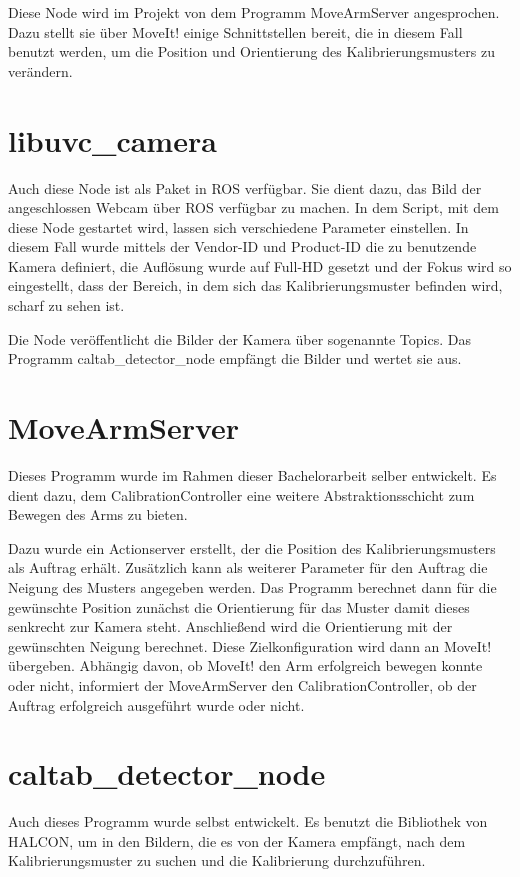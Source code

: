 Diese Node wird im Projekt von dem Programm MoveArmServer angesprochen. Dazu stellt sie über MoveIt! einige Schnittstellen bereit, die in diesem Fall benutzt werden, um die Position und Orientierung des Kalibrierungsmusters zu verändern.

\section{libuvc\_camera} %
\label{sec:libuvc_camera}
Auch diese Node ist als Paket in ROS verfügbar. Sie dient dazu, das Bild der angeschlossen Webcam über ROS verfügbar zu machen. In dem Script, mit dem diese Node gestartet wird, lassen sich verschiedene Parameter einstellen. In diesem Fall wurde mittels der Vendor-ID und Product-ID die zu benutzende Kamera definiert, die Auflösung wurde auf Full-HD gesetzt und der Fokus wird so eingestellt, dass der Bereich, in dem sich das Kalibrierungsmuster befinden wird, scharf zu sehen ist.

Die Node veröffentlicht die Bilder der Kamera über sogenannte Topics. Das Programm caltab\_detector\_node empfängt die Bilder und wertet sie aus.

\section{MoveArmServer} %
\label{sec:movearmserver}
Dieses Programm wurde im Rahmen dieser Bachelorarbeit selber entwickelt. Es dient dazu, dem CalibrationController eine weitere Abstraktionsschicht zum Bewegen des Arms zu bieten.

Dazu wurde ein Actionserver erstellt, der die Position des Kalibrierungsmusters als Auftrag erhält. Zusätzlich kann als weiterer Parameter für den Auftrag die Neigung des Musters angegeben werden. Das Programm berechnet dann für die gewünschte Position zunächst die Orientierung für das Muster damit dieses senkrecht zur Kamera steht. Anschließend wird die Orientierung mit der gewünschten Neigung berechnet. Diese Zielkonfiguration wird dann an MoveIt! übergeben. Abhängig davon, ob MoveIt! den Arm erfolgreich bewegen konnte oder nicht, informiert der MoveArmServer den CalibrationController, ob der Auftrag erfolgreich ausgeführt wurde oder nicht.

\section{caltab\_detector\_node} %
\label{sec:caltab_detector_node}
Auch dieses Programm wurde selbst entwickelt. Es benutzt die Bibliothek von HALCON, um in den Bildern, die es von der Kamera empfängt, nach dem Kalibrierungsmuster zu suchen und die Kalibrierung durchzuführen.

